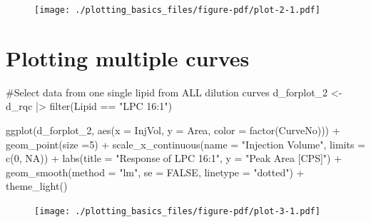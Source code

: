 \documentclass[
  letterpaper,
  DIV=11,
  numbers=noendperiod]{scrreprt}
\newenvironment{Shaded}{\begin{snugshade}}{\end{snugshade}}
\newcommand{\AttributeTok}[1]{\textcolor[rgb]{0.40,0.45,0.13}{#1}}
\newcommand{\CommentTok}[1]{\textcolor[rgb]{0.37,0.37,0.37}{#1}}
\newcommand{\ConstantTok}[1]{\textcolor[rgb]{0.56,0.35,0.01}{#1}}
\newcommand{\DecValTok}[1]{\textcolor[rgb]{0.68,0.00,0.00}{#1}}
\newcommand{\FunctionTok}[1]{\textcolor[rgb]{0.28,0.35,0.67}{#1}}
\newcommand{\NormalTok}[1]{\textcolor[rgb]{0.00,0.23,0.31}{#1}}
\newcommand{\OtherTok}[1]{\textcolor[rgb]{0.00,0.23,0.31}{#1}}
\newcommand{\SpecialCharTok}[1]{\textcolor[rgb]{0.37,0.37,0.37}{#1}}
\newcommand{\StringTok}[1]{\textcolor[rgb]{0.13,0.47,0.30}{#1}}
\begin{document}
\begin{figure}[H]

{\centering \texttt{[image: ./plotting\_basics\_files/figure-pdf/plot-2-1.pdf]}

}

\end{figure}

\hypertarget{plotting-multiple-curves}{%
\section{Plotting multiple curves}\label{plotting-multiple-curves}}

\begin{Shaded}
\begin{Highlighting}[]
\CommentTok{\#Select data from one single lipid from ALL dilution curves}
\NormalTok{d\_forplot\_2 }\OtherTok{\textless{}{-}}\NormalTok{ d\_rqc  }\SpecialCharTok{|\textgreater{}} \FunctionTok{filter}\NormalTok{(Lipid }\SpecialCharTok{==} \StringTok{"LPC 16:1"}\NormalTok{)}

\FunctionTok{ggplot}\NormalTok{(d\_forplot\_2, }\FunctionTok{aes}\NormalTok{(}\AttributeTok{x =}\NormalTok{ InjVol, }\AttributeTok{y =}\NormalTok{ Area, }\AttributeTok{color =} \FunctionTok{factor}\NormalTok{(CurveNo))) }\SpecialCharTok{+} 
  \FunctionTok{geom\_point}\NormalTok{(}\AttributeTok{size =}\DecValTok{5}\NormalTok{) }\SpecialCharTok{+}
  \FunctionTok{scale\_x\_continuous}\NormalTok{(}\AttributeTok{name =} \StringTok{"Injection Volume"}\NormalTok{, }\AttributeTok{limits =} \FunctionTok{c}\NormalTok{(}\DecValTok{0}\NormalTok{, }\ConstantTok{NA}\NormalTok{)) }\SpecialCharTok{+} 
  \FunctionTok{labs}\NormalTok{(}\AttributeTok{title =} \StringTok{"Response of LPC 16:1"}\NormalTok{, }\AttributeTok{y =} \StringTok{"Peak Area [CPS]"}\NormalTok{) }\SpecialCharTok{+}
  \FunctionTok{geom\_smooth}\NormalTok{(}\AttributeTok{method =} \StringTok{"lm"}\NormalTok{, }\AttributeTok{se =} \ConstantTok{FALSE}\NormalTok{, }\AttributeTok{linetype =} \StringTok{"dotted"}\NormalTok{) }\SpecialCharTok{+}
  \FunctionTok{theme\_light}\NormalTok{()}
\end{Highlighting}
\end{Shaded}

\begin{figure}[H]

{\centering \texttt{[image: ./plotting\_basics\_files/figure-pdf/plot-3-1.pdf]}

}

\end{figure}
\end{document}
